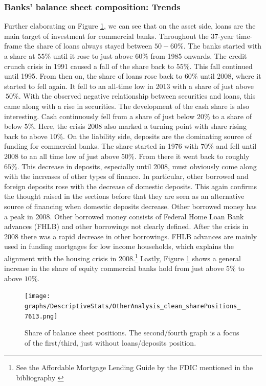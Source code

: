 \documentclass[12pt, a4paper]{article} %
\begin{document}
\subsubsection{Banks' balance sheet composition: Trends}
\label{sec:shareBalanceSheetAccounts}
Further elaborating on Figure \ref{fig:share_both}, we can see that on the asset side, loans are the main target of investment for commercial banks. Throughout the 37-year time-frame the share of loans always stayed between $50-60\%$. The banks started with a share at $55\%$ until it rose to just above $60\%$ from 1985 onwards. The credit crunch crisis in 1991 caused a fall of the share back to $55\%$. This fall continued until 1995. From then on, the share of loans rose back to $60\%$ until 2008, where it started to fell again. It fell to an all-time low in 2013 with a share of just above $~50\%$. With the observed negative relationship between securities and loans, this came along with a rise in securities. 
The development of the cash share is also interesting. Cash continuously fell from a share of just below $20\%$ to a share of below $5\%$. Here, the crisis 2008 also marked a turning point with share rising back to above $10\%$.
On the liability side, deposits are the dominating source of funding for commercial banks. The share started in 1976 with $70\%$ and fell until 2008 to an all time low of just above $50\%$. From there it went back to roughly $65\%$. This decrease in deposits, especially until 2008, must obviously come along with the increases of other types of finance. In particular, other borrowed and foreign deposits rose with the decrease of domestic deposits. This again confirms the thought raised in the sections before that they are seen as an alternative source of financing when domestic deposits decrease.
Other borrowed money has a peak in 2008. Other borrowed money consists of Federal Home Loan Bank advances (FHLB) and other borrowings not clearly defined. After the crisis in 2008 there was a rapid decrease in other borrowings. FHLB advances are mainly used in funding mortgages for low income households, which explains the alignment with the housing crisis in 2008.\footnote{See the Affordable Mortgage Lending Guide by the FDIC mentioned in the bibliography \citet{FHLB}} Lastly, Figure \ref{fig:share_both} shows a general increase in the share of equity commercial banks hold from just above $5\%$ to above $10\%$. 

\begin{figure}[H]
\begin{minipage}{\textwidth}
\texttt{[image: graphs/DescriptiveStats/OtherAnalysis\_clean\_sharePositions\_7613.png]}
\caption[1]{Share of balance sheet positions. The second/fourth graph is a focus of the first/third, just without loans/deposits position. }
\label{fig:share_both}
\end{minipage}
\end{figure}
 
\end{document}
